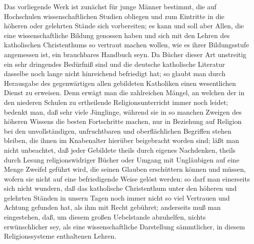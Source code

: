 %
Das vorliegende Werk ist zunächst für junge Männer bestimmt, die auf Hochschulen wissenschaftlichen Studien obliegen und zum Eintritte in die höheren oder gelehrten Stände sich vorbereiten; es kann und soll aber Allen, die eine wissenschaftliche Bildung genossen haben und sich mit den Lehren des katholischen Christenthums so vertraut machen wollen, wie es ihrer Bildungsstufe angemessen ist, ein brauchbares Handbuch seyn. Da Bücher dieser Art unstreitig ein sehr dringendes Bedürfniß sind und die deutsche katholische Literatur dasselbe noch lange nicht hinreichend befriedigt hat; so glaubt man durch Herausgabe des gegenwärtigen allen gebildeten Katholiken einen wesentlichen Dienst zu erweisen. Denn erwägt man die zahlreichen Mängel, an welchen der in den niederen Schulen zu ertheilende Religionsunterricht immer noch leidet; bedenkt man, daß sehr viele Jünglinge, während sie in so manchen Zweigen des höheren Wissens die besten Fortschritte machen, nur in Beziehung auf Religion bei den unvollständigen, unfruchtbaren und oberflächlichen Begriffen stehen bleiben, die ihnen im Knabenalter hierüber beigebracht worden sind; läßt man nicht unbeachtet, daß jeder Gebildete theils durch eigenes Nachdenken, theils durch Lesung religionswidriger Bücher oder Umgang mit Ungläubigen auf eine Menge Zweifel geführt wird, die seinen Glauben erschüttern können und müssen, wofern sie nicht auf eine befriedigende Weise gelöst werden: so darf man einerseits sich nicht wundern, daß das katholische Christenthum unter den höheren und gelehrten Ständen in unsern Tagen noch immer nicht so viel Vertrauen und Achtung gefunden hat, als ihm mit Recht gebühret; anderseits muß man eingestehen, daß, um diesem großen Uebelstande abzuhelfen, nichts erwünschlicher sey, als eine wissenschaftliche Darstellung sämmtlicher, in diesem Religionssysteme enthaltenen Lehren.\par
